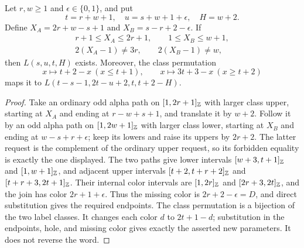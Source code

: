 \begin{lemma}\label{mc:two-odd-kernel}
Let $r,w\ge1$ and $\epsilon\in\{0,1\}$, and put
\[
 t=r+w+1,\quad u=s+w+1+\epsilon,\quad H=w+2.
\]
Define $X_A=2r+w-s+1$ and $X_B=s-r+2-\epsilon$.
If
\[
\begin{gathered}
 r+1\le X_A\le2r+1,\qquad 1\le X_B\le w+1,\\
 2(X_A-1)\ne3r,\qquad2(X_B-1)\ne w,
\end{gathered}
\]
then $L(s,u,t,H)$ exists.  Moreover, the class permutation
\[
 x\longmapsto t+2-x\ (x\le t+1),\qquad
 x\longmapsto3t+3-x\ (x\ge t+2)
\]
maps it to $L(t-s-1,2t-u+2,t,t+2-H)$.
\end{lemma}
\begin{proof}
Take an ordinary odd alpha path on $[1,2r+1]_{\mathbb Z}$
with larger class upper, starting at $X_A$ and ending at
$r-w+s+1$, and translate it by $w+2$.
Follow it by an odd alpha path on $[1,2w+1]_{\mathbb Z}$
with larger class lower, starting at $X_B$ and ending at
$w-s+r+\epsilon$; keep its lowers and raise its uppers by
$2r+2$.  The latter request is the complement of the ordinary
upper request, so its forbidden equality is exactly the one displayed.
The two paths give lower intervals $[w+3,t+1]_{\mathbb Z}$ and
$[1,w+1]_{\mathbb Z}$, and adjacent upper intervals
$[t+2,t+r+2]_{\mathbb Z}$ and
$[t+r+3,2t+1]_{\mathbb Z}$.
Their internal color intervals are $[1,2r]_{\mathbb Z}$ and
$[2r+3,2t]_{\mathbb Z}$, and the join has color $2r+1+\epsilon$.
Thus the missing color is $2r+2-\epsilon=D$, and direct substitution
gives the required endpoints.  The class permutation is a bijection
of the two label classes.  It changes each color $d$ to $2t+1-d$;
substitution in the endpoints, hole, and missing color gives exactly
the asserted new parameters.  It does not reverse the word.
\end{proof}

